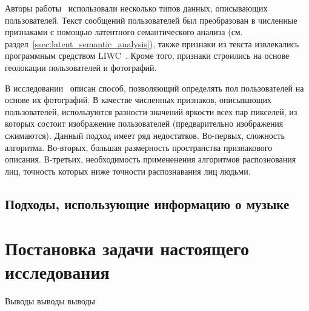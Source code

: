 Авторы работы~\cite{farseev2015harvesting} использовали несколько
типов данных, описывающих пользователей. Текст сообщений пользователей
был преобразован в численные признаками с помощью латентного
семантического анализа (см. раздел~\ref{ssec:latent_semantic_analysis}),
также признаки из текста извлекались программным средством
LIWC~\cite{pennebaker2001linguistic}. Кроме того, признаки
строились на основе геолокации пользователей и фотографий.

В исследовании~\cite{baluja2007boosting} описан способ, позволяющий
определять пол пользователей на основе их фотографий. В качестве 
численных признаков, описывающих пользователей, используются
разности значений яркости всех пар пикселей, из которых состоит
изображение пользователей (предварительно изображения сжимаются).
Данный подход имеет ряд недостатков. Во-первых, сложность
алгоритма. Во-вторых, большая размерность пространства признакового
описания. В-третьих, необходимость примененения алгоритмов
распознования лиц, точность которых ниже точности распознавания
лиц людьми.

\subsection{Подходы, использующие информацию о музыке}
\label{ssec:with_music}

\section{Постановка задачи настоящего исследования}
\label{sec:problem_formulation}

\chapterconclusion

Выводы выводы выводы
